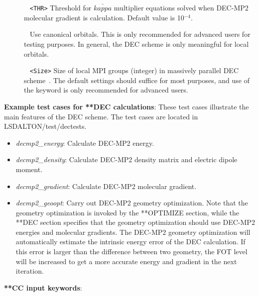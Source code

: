 \begin{description}
\item[] \verb| | \newline
\verb|<THR>|\newline
Threshold for $\bar{kappa}$ multiplier equations solved when DEC-MP2 molecular gradient is calculation. Default value is 10$^{-4}$.


\item[] \verb| | \newline
Use canonical orbitals. This is only recommended for advanced users for testing purposes. In general, the DEC scheme is only meaningful for local orbitals.

\item[] \verb| | \newline
\verb|<Size>|\newline
Size of local MPI groups (integer) in massively parallel DEC scheme~\cite{dec6}. The default settings should suffice for most purposes, and use of the keyword is only recommended for advanced users.


\end{description}

\vspace{1 cm}
\noindent
\textbf{Example test cases for **DEC calculations}: \newline
These test cases illustrate the main features of the DEC scheme. The test cases are located in LSDALTON/test/dectests.

\begin{itemize}
\item
\textit{decmp2\_energy}: Calculate DEC-MP2 energy.
\item
\textit{decmp2\_density}: Calculate DEC-MP2 density matrix and electric dipole moment.
\item
\textit{decmp2\_gradient}: Calculate DEC-MP2 molecular gradient.
\item
\textit{decmp2\_geoopt}: Carry out DEC-MP2 geometry optimization. Note that the geometry optimization is invoked by the **OPTIMIZE section, while the **DEC section specifies that the geometry optimization should use DEC-MP2 energies and molecular gradients. The DEC-MP2 geometry optimization will automatically estimate the intrinsic energy error of the DEC calculation. If this error is larger than the difference between two geometry, the FOT level will be increased to get a more accurate energy and gradient in the next iteration.
\end{itemize}


\vspace{1 cm}
\noindent
\textbf{**CC input keywords}:

